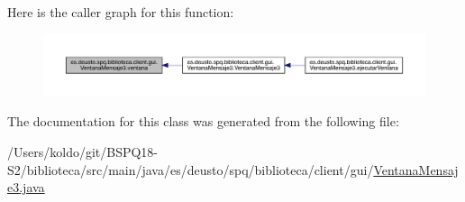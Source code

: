 Here is the caller graph for this function\+:
\nopagebreak
\begin{figure}[H]
\begin{center}
\leavevmode
\includegraphics[width=350pt]{classes_1_1deusto_1_1spq_1_1biblioteca_1_1client_1_1gui_1_1_ventana_mensaje3_a9e0e23158e6fcc44783491bf9d48e98d_icgraph}
\end{center}
\end{figure}


The documentation for this class was generated from the following file\+:\begin{DoxyCompactItemize}
\item 
/\+Users/koldo/git/\+B\+S\+P\+Q18-\/\+S2/biblioteca/src/main/java/es/deusto/spq/biblioteca/client/gui/\mbox{\hyperlink{_ventana_mensaje3_8java}{Ventana\+Mensaje3.\+java}}\end{DoxyCompactItemize}
